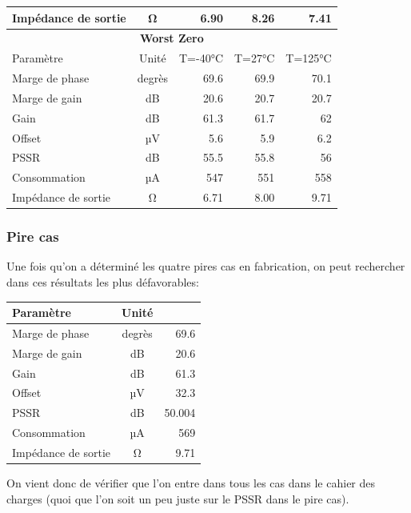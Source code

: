 \documentclass{article}
\begin{document}
\begin{center}
\begin{tabular}{|l|c|r|r|r|}
    \hline
    Impédance de sortie & Ω & 6.90 & 8.26 & 7.41 \\
    \hline
    \multicolumn{5}{|c|}{\textbf{Worst Zero}}\\
    \hline
    Paramètre & Unité & T=-40°C & T=27°C & T=125°C \\
    \hline
    Marge de phase & degrès & 69.6 & 69.9 & 70.1 \\
    \hline
    Marge de gain & dB & 20.6 & 20.7 & 20.7 \\
    \hline
    Gain & dB & 61.3 & 61.7 & 62 \\
    \hline
    Offset & µV & 5.6 & 5.9 & 6.2 \\
    \hline
    PSSR & dB & 55.5 & 55.8 & 56 \\
    \hline
    Consommation & µA & 547 & 551 & 558 \\
    \hline
    Impédance de sortie & Ω & 6.71 & 8.00 & 9.71 \\
    \hline
\end{tabular}
\end{center}

\subsubsection{Pire cas}

Une fois qu’on a déterminé les quatre pires cas en fabrication, on peut rechercher dans ces résultats les plus défavorables:

\begin{center}
\begin{tabular}{|l|c|r|}
    \hline
    Paramètre & Unité & \\
    \hline
    Marge de phase & degrès & 69.6 \\
    \hline
    Marge de gain & dB & 20.6 \\
    \hline
    Gain & dB &  61.3 \\
    \hline
    Offset & µV & 32.3 \\
    \hline
    PSSR & dB & 50.004 \\
    \hline
    Consommation & µA & 569 \\
    \hline
    Impédance de sortie & Ω & 9.71 \\
    \hline
\end{tabular}
\end{center}

On vient donc de vérifier que l’on entre dans tous les cas dans le cahier des charges (quoi que l’on soit un peu juste sur le PSSR dans le pire cas).
\end{document}
